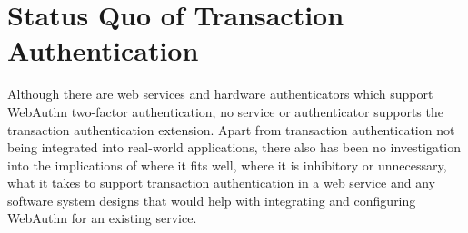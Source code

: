 



\section{Status Quo of Transaction Authentication}\label{Sec:StatusQuo}


Although there are web services and hardware authenticators which support WebAuthn two-factor authentication, no service or authenticator supports the transaction authentication extension. Apart from transaction authentication not being integrated into real-world applications, there also has been no investigation into the implications of where it fits well, where it is inhibitory or unnecessary, what it takes to support transaction authentication in a web service and any software system designs that would help with integrating and configuring WebAuthn for an existing service.

